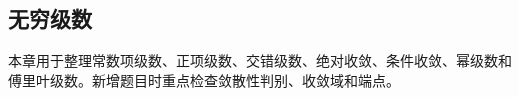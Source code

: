 \subsection{无穷级数}

\begin{knowledgeBox}
本章用于整理常数项级数、正项级数、交错级数、绝对收敛、条件收敛、幂级数和傅里叶级数。新增题目时重点检查敛散性判别、收敛域和端点。
\end{knowledgeBox}
